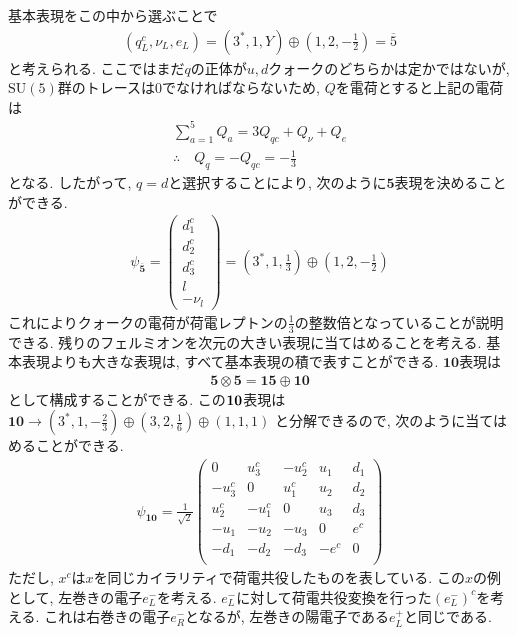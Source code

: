 基本表現をこの中から選ぶことで
\begin{align}
  (q_L^c, \nu_L, e_L) = (3^*, 1, Y)\oplus\left(1,2,-\frac{1}{2}\right) = \overline{5}
\end{align}
と考えられる.
ここではまだ$q$の正体が$u, d$クォークのどちらかは定かではないが, $\mathrm{SU}(5)$群のトレースは0でなければならないため, $Q$を電荷とすると上記の電荷は
\begin{align}
  \sum_{a=1}^5 Q_a = 3Q_{qc}+Q_\nu + Q_e\nonumber\\
  \therefore\quad Q_q = -Q_{qc} = -\frac{1}{3}\label{quantum_Q}
\end{align}
となる.
したがって, $q=d$と選択することにより, 次のように$\bm{5}$表現を決めることができる.
\begin{align}
 \psi_{\overline{\bm{5}}} =\begin{pmatrix}
    d_1 ^c \\
    d_2 ^c \\
    d_3 ^c \\
    l      \\
    -\nu_l
  \end{pmatrix}=\left({3}^*,1,\frac{1}{3}\right)\oplus \left(1,2,-\frac{1}{2}\right)\label{GUT-5rep}
\end{align}
これによりクォークの電荷が荷電レプトンの$\frac{1}{3}$の整数倍となっていることが説明できる.
残りのフェルミオンを次元の大きい表現に当てはめることを考える.
基本表現よりも大きな表現は, すべて基本表現の積で表すことができる.
${\bm{10}}$表現は
\begin{align}
  \bm{5}\otimes\bm{5} = \bm{15}\oplus\bm{10}\nonumber
\end{align}
として構成することができる.
この$\bf{10}$表現は$\bm{10}\rightarrow (3^*,1,-\frac{2}{3})\oplus(3,2,\frac{1}{6})\oplus(1,1,1)$
と分解できるので, 次のように当てはめることができる.
\begin{align}
\psi_{{\bm{10}}} = \frac{1}{\sqrt{2}}\begin{pmatrix}
         0 &  u_3^c & -u_2^c & u_1 & d_1 \\
    -u_3^c &      0 &  u_1^c & u_2 & d_2 \\
     u_2^c & -u_1^c &      0 & u_3 & d_3 \\
    -u_1   &   -u_2 &   -u_3 &   0 & e^c \\
      -d_1 &   -d_2 &   -d_3 &-e^c &   0 \\
    \end{pmatrix}\label{GUT-10rep}
\end{align}
ただし, $x^c$は$x$を同じカイラリティで荷電共役したものを表している.
この$x$の例として, 左巻きの電子$e^-_L$を考える.
$e^-_L$に対して荷電共役変換を行った$(e^-_L)^c$を考える.
これは右巻きの電子$e_R^-$となるが, 左巻きの陽電子である$e_L^+$と同じである.
